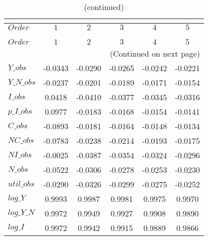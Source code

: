  
\begin{center}
\begin{longtable}{lccccc} 
\caption{COEFFICIENTS OF AUTOCORRELATION}\\
 \label{Table:th_autocorr_matrix}\\
\toprule 
$Order      $	 & 	 $          1$	 & 	 $          2$	 & 	 $          3$	 & 	 $          4$	 & 	 $          5$\\
\midrule \endfirsthead 
\caption{(continued)}\\
 \toprule \\ 
$Order      $	 & 	 $          1$	 & 	 $          2$	 & 	 $          3$	 & 	 $          4$	 & 	 $          5$\\
\midrule \endhead 
\midrule \multicolumn{6}{r}{(Continued on next page)} \\ \bottomrule \endfoot 
\bottomrule \endlastfoot 
$Y\_obs     $	 & 	    -0.0343	 & 	    -0.0290	 & 	    -0.0265	 & 	    -0.0242	 & 	    -0.0221 \\ 
$Y\_N\_obs  $	 & 	    -0.0237	 & 	    -0.0201	 & 	    -0.0189	 & 	    -0.0171	 & 	    -0.0154 \\ 
$I\_obs     $	 & 	     0.0418	 & 	    -0.0410	 & 	    -0.0377	 & 	    -0.0345	 & 	    -0.0316 \\ 
$p\_I\_obs  $	 & 	     0.0977	 & 	    -0.0183	 & 	    -0.0168	 & 	    -0.0154	 & 	    -0.0141 \\ 
$C\_obs     $	 & 	    -0.0893	 & 	    -0.0181	 & 	    -0.0164	 & 	    -0.0148	 & 	    -0.0134 \\ 
$NC\_obs    $	 & 	    -0.0783	 & 	    -0.0238	 & 	    -0.0214	 & 	    -0.0193	 & 	    -0.0175 \\ 
$NI\_obs    $	 & 	    -0.0025	 & 	    -0.0387	 & 	    -0.0354	 & 	    -0.0324	 & 	    -0.0296 \\ 
$N\_obs     $	 & 	    -0.0522	 & 	    -0.0306	 & 	    -0.0278	 & 	    -0.0253	 & 	    -0.0230 \\ 
$util\_obs  $	 & 	    -0.0290	 & 	    -0.0326	 & 	    -0.0299	 & 	    -0.0275	 & 	    -0.0252 \\ 
$log\_Y     $	 & 	     0.9993	 & 	     0.9987	 & 	     0.9981	 & 	     0.9975	 & 	     0.9970 \\ 
$log\_Y\_N  $	 & 	     0.9972	 & 	     0.9949	 & 	     0.9927	 & 	     0.9908	 & 	     0.9890 \\ 
$log\_I     $	 & 	     0.9972	 & 	     0.9942	 & 	     0.9915	 & 	     0.9889	 & 	     0.9866 \\ 

\end{longtable}
\end{center}
